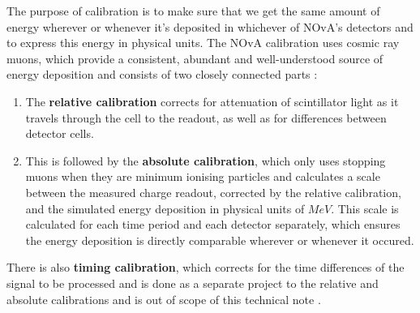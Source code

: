 \documentclass[12pt,a4paper]{article}
\begin{document}
The purpose of calibration is to make sure that we get the same amount of energy wherever or whenever it's deposited in whichever of NOvA's detectors and to express this energy in physical units. The NOvA calibration uses cosmic ray muons, which provide a consistent, abundant and well-understood source of energy deposition and consists of two closely connected parts \cite{NOVA-doc-7410}:
\begin{enumerate}
\item The \textbf{relative calibration} corrects for attenuation of scintillator light as it travels through the cell to the readout, as well as for differences between detector cells.
\item This is followed by the \textbf{absolute calibration}, which only uses stopping muons when they are minimum ionising particles and calculates a scale between the measured charge readout, corrected by the relative calibration, and the simulated energy deposition in physical units of $\unit{MeV}$. This scale is calculated for each time period and each detector separately, which ensures the energy deposition is directly comparable wherever or whenever it occured.
\end{enumerate}

There is also \textbf{timing calibration}, which corrects for the time differences of the signal to be processed and is done as a separate project to the relative and absolute calibrations and is out of scope of this technical note \cite{NinerThesis}.



\end{document}
